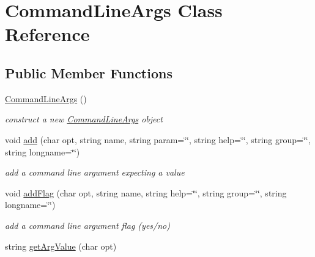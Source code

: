 \hypertarget{classCommandLineArgs}{}\section{Command\+Line\+Args Class Reference}
\label{classCommandLineArgs}
\subsection*{Public Member Functions}
\begin{DoxyCompactItemize}
\item 
\mbox{\label{classCommandLineArgs_adf3473a1701ad5b5945b1ad5fbe0db9b}} 
\hyperlink{classCommandLineArgs_adf3473a1701ad5b5945b1ad5fbe0db9b}{Command\+Line\+Args} ()
\begin{DoxyCompactList}\small\item\em construct a new \hyperlink{classCommandLineArgs}{Command\+Line\+Args} object \end{DoxyCompactList}\item 
\mbox{\label{classCommandLineArgs_a11bbea9577ad97fa8ccb024a9869e4c5}} 
void \hyperlink{classCommandLineArgs_a11bbea9577ad97fa8ccb024a9869e4c5}{add} (char opt, string name, string param=\char`\"{}\char`\"{}, string help=\char`\"{}\char`\"{}, string group=\char`\"{}\char`\"{}, string longname=\char`\"{}\char`\"{})
\begin{DoxyCompactList}\small\item\em add a command line argument expecting a value \end{DoxyCompactList}\item 
\mbox{\label{classCommandLineArgs_aae885cc296df2013e8e30eeba30d1483}} 
void \hyperlink{classCommandLineArgs_aae885cc296df2013e8e30eeba30d1483}{add\+Flag} (char opt, string name, string help=\char`\"{}\char`\"{}, string group=\char`\"{}\char`\"{}, string longname=\char`\"{}\char`\"{})
\begin{DoxyCompactList}\small\item\em add a command line argument flag (yes/no) \end{DoxyCompactList}\item 
\mbox{\label{classCommandLineArgs_a673c25d7b7c3cbb3d243b5ee4f65f76c}} 
string \hyperlink{classCommandLineArgs_a673c25d7b7c3cbb3d243b5ee4f65f76c}{get\+Arg\+Value} (char opt)

\end{DoxyCompactItemize}
